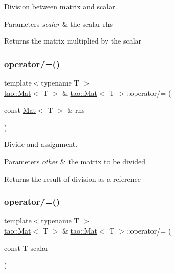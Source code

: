 Division between matrix and scalar. 


\begin{DoxyParams}{Parameters}
{\em scalar} & the scalar rhs \\
\hline
\end{DoxyParams}
\begin{DoxyReturn}{Returns}
the matrix multiplied by the scalar 
\end{DoxyReturn}
\mbox{\label{classtao_1_1_mat_a032760595aa5055588624aa56758b323}} 
\subsubsection{\texorpdfstring{operator/=()}{operator/=()}\hspace{0.1cm}{\footnotesize\ttfamily [1/2]}}
{\footnotesize\ttfamily template$<$typename T $>$ \\
\mbox{\hyperlink{classtao_1_1_mat}{tao\+::\+Mat}}$<$ T $>$ \& \mbox{\hyperlink{classtao_1_1_mat}{tao\+::\+Mat}}$<$ T $>$\+::operator/= (\begin{DoxyParamCaption}\item[{const \mbox{\hyperlink{classtao_1_1_mat}{Mat}}$<$ T $>$ \&}]{rhs }\end{DoxyParamCaption})}



Divide and assignment. 


\begin{DoxyParams}{Parameters}
{\em other} & the matrix to be divided \\
\hline
\end{DoxyParams}
\begin{DoxyReturn}{Returns}
the result of division as a reference 
\end{DoxyReturn}
\mbox{\label{classtao_1_1_mat_a2c5e0650cbc59030c4491c439bcd5b28}} 
\subsubsection{\texorpdfstring{operator/=()}{operator/=()}\hspace{0.1cm}{\footnotesize\ttfamily [2/2]}}
{\footnotesize\ttfamily template$<$typename T $>$ \\
\mbox{\hyperlink{classtao_1_1_mat}{tao\+::\+Mat}}$<$ T $>$ \& \mbox{\hyperlink{classtao_1_1_mat}{tao\+::\+Mat}}$<$ T $>$\+::operator/= (\begin{DoxyParamCaption}\item[{const T}]{scalar }\end{DoxyParamCaption})}



